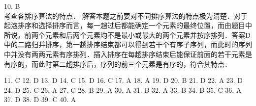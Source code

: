 10. B \\
考查各排序算法的特点．
解答本题之前要对不同排序算法的特点极为清楚．对于起泡排序和选择排序而言，每一趟过后都能确定一个元素的最终位置，而由题目中所说，前两个元素和后两个元素均不是最小或最大的两个元素并按序排列．答案D 中的二路归并排序，第一趟排序结束都可以得到若干个有序子序列，而此时的序列中并没有两两元素有序排列．插入排序在每趟排序结束后能保证前面的若干元素是有序的，而此时第二趟排序后，序列的前三个元素是有序的，符合其特点．

11. C 12. D 13. D 14. C 15. D 16. C
17. A 18. A 19. D 20. B 21. D 22. A 23. D 24. D
25. C 26. A 27. C 28. B 29. A 30. A 31. B 32. A
33. B 34. B 35. C 36. A 37. D 38. D 39. C 40. A